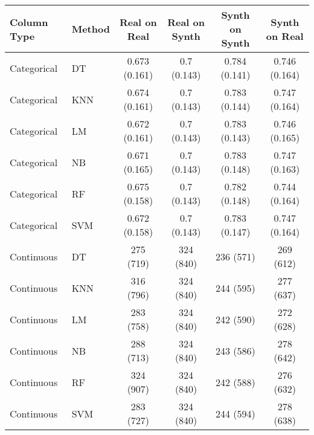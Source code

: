 
\begin{tabular}{llcccc}
    \toprule
    Column Type & Method & Real on Real  & Real on Synth & Synth on Synth & Synth on Real \\
    \midrule
    Categorical & DT     & 0.673 (0.161) & 0.7 (0.143)   & 0.784 (0.141)  & 0.746 (0.164) \\
    Categorical & KNN    & 0.674 (0.161) & 0.7 (0.143)   & 0.783 (0.144)  & 0.747 (0.164) \\
    Categorical & LM     & 0.672 (0.161) & 0.7 (0.143)   & 0.783 (0.143)  & 0.746 (0.165) \\
    Categorical & NB     & 0.671 (0.165) & 0.7 (0.143)   & 0.783 (0.148)  & 0.747 (0.163) \\
    Categorical & RF     & 0.675 (0.158) & 0.7 (0.143)   & 0.782 (0.148)  & 0.744 (0.164) \\
    Categorical & SVM    & 0.672 (0.158) & 0.7 (0.143)   & 0.783 (0.147)  & 0.747 (0.164) \\
    \midrule
    Continuous  & DT     & 275 (719) & 324 (840) & 236 (571)  & 269 (612) \\
    Continuous  & KNN    & 316 (796) & 324 (840) & 244 (595)  & 277 (637) \\
    Continuous  & LM     & 283 (758) & 324 (840) & 242 (590)  & 272 (628) \\
    Continuous  & NB     & 288 (713) & 324 (840) & 243 (586)  & 278 (642) \\
    Continuous  & RF     & 324 (907) & 324 (840) & 242 (588)  & 276 (632) \\
    Continuous  & SVM    & 283 (727) & 324 (840) & 244 (594)  & 278 (638) \\   
    \bottomrule
    \end{tabular}

